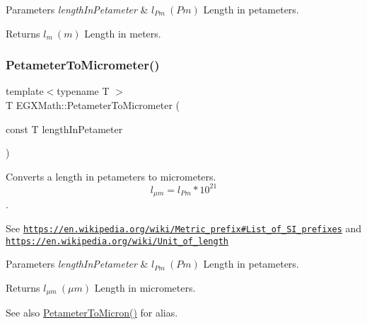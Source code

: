 \begin{DoxyParams}{Parameters}
{\em length\+In\+Petameter} & $ l_{Pm}\ (Pm)$ Length in petameters. \\
\hline
\end{DoxyParams}
\begin{DoxyReturn}{Returns}
$ l_{m}\ (m)$ Length in meters. 
\end{DoxyReturn}
\mbox{\label{group___e_g_x_math-_conversions-_length_conversions-_petameter-_s_i_ga3cbe403b66dcb4d5abca922fc48a9a1c}} 
\subsubsection{\texorpdfstring{Petameter\+To\+Micrometer()}{PetameterToMicrometer()}}
{\footnotesize\ttfamily template$<$typename T $>$ \\
T E\+G\+X\+Math\+::\+Petameter\+To\+Micrometer (\begin{DoxyParamCaption}\item[{const T}]{length\+In\+Petameter }\end{DoxyParamCaption})}



Converts a length in petameters to micrometers. \[ l_{\mu m}=l_{Pm} * 10^{21} \]. 

See \href{https://en.wikipedia.org/wiki/Metric_prefix#List_of_SI_prefixes}{\tt https\+://en.\+wikipedia.\+org/wiki/\+Metric\+\_\+prefix\#\+List\+\_\+of\+\_\+\+S\+I\+\_\+prefixes} and \href{https://en.wikipedia.org/wiki/Unit_of_length}{\tt https\+://en.\+wikipedia.\+org/wiki/\+Unit\+\_\+of\+\_\+length} 
\begin{DoxyParams}{Parameters}
{\em length\+In\+Petameter} & $ l_{Pm}\ (Pm)$ Length in petameters. \\
\hline
\end{DoxyParams}
\begin{DoxyReturn}{Returns}
$ l_{\mu m}\ (\mu m)$ Length in micrometers. 
\end{DoxyReturn}
\begin{DoxySeeAlso}{See also}
\mbox{\hyperlink{group___e_g_x_math-_conversions-_length_conversions-_petameter-_non-_s_i_gad1c1c26c232339c6304962d20cb29252}{Petameter\+To\+Micron()}} for alias. 
\end{DoxySeeAlso}
\mbox{\label{group___e_g_x_math-_conversions-_length_conversions-_petameter-_s_i_ga932654bf571e2dd9aa912a34fbcfe49f}} 

